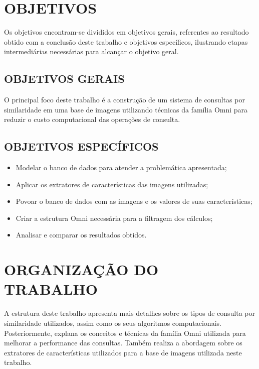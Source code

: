 \section{OBJETIVOS}
\label{sec:objetivos}
Os objetivos encontram-se divididos em objetivos gerais, referentes ao resultado obtido com a conclusão deste trabalho e objetivos específicos, ilustrando etapas intermediárias necessárias para alcançar o objetivo geral.
\subsection{OBJETIVOS GERAIS}
\label{subsec:objger}
O principal foco deste trabalho é a construção de um sistema de consultas por similaridade em uma base de imagens utilizando técnicas da família Omni para reduzir o custo computacional das operações de consulta.

\subsection{OBJETIVOS ESPECÍFICOS}
\label{subsec:objesp}
\begin{itemize}
 \item Modelar o banco de dados para atender a problemática apresentada;
 \item Aplicar os extratores de características das imagens utilizadas;
 \item Povoar o banco de dados com as imagens e os valores de suas características;
 \item Criar a estrutura Omni necessária para a filtragem dos cálculos;
 \item Analisar e comparar os resultados obtidos.
\end{itemize}


\section{ORGANIZAÇÃO DO TRABALHO}
\label{sec:organizacaoTrabalho}

A estrutura deste trabalho apresenta mais detalhes sobre os tipos de consulta por similaridade utilizados, assim como os seus algoritmos computacionais. Posteriormente, explana os conceitos e técnicas da família Omni utilizada para
melhorar a performance das consultas. Também realiza a abordagem sobre os extratores de características utilizados para a base de imagens utilizada neste trabalho.
